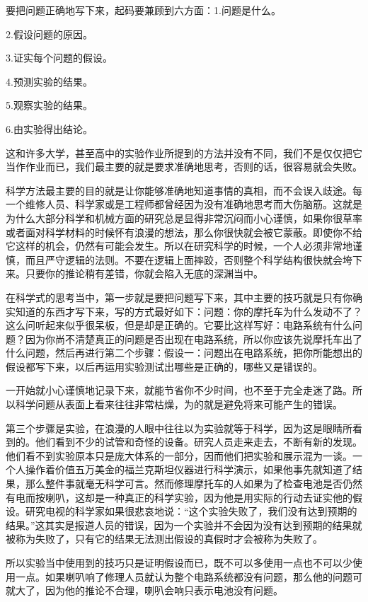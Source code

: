 \documentclass[UTF8]{article}
\begin{document}
\par 要把问题正确地写下来，起码要兼顾到六方面：1.问题是什么。
\par 2.假设问题的原因。
\par 3.证实每个问题的假设。
\par 4.预测实验的结果。
\par 5.观察实验的结果。
\par 6.由实验得出结论。
\par 这和许多大学，甚至高中的实验作业所提到的方法并没有不同，我们不是仅仅把它当作作业而已，我们最主要的就是要求准确地思考，否则的话，很容易就会失败。
\par 科学方法最主要的目的就是让你能够准确地知道事情的真相，而不会误入歧途。每一个维修人员、科学家或是工程师都曾经因为没有准确地思考而大伤脑筋。这就是为什么大部分科学和机械方面的研究总是显得非常沉闷而小心谨慎，如果你很草率或者面对科学材料的时候怀有浪漫的想法，那么你很快就会被它蒙蔽。即使你不给它这样的机会，仍然有可能会发生。所以在研究科学的时候，一个人必须非常地谨慎，而且严守逻辑的法则。不要在逻辑上面摔跤，否则整个科学结构很快就会垮下来。只要你的推论稍有差错，你就会陷入无底的深渊当中。
\par 在科学式的思考当中，第一步就是要把问题写下来，其中主要的技巧就是只有你确实知道的东西才写下来，写的方式最好如下：问题：你的摩托车为什么发动不了？这么问听起来似乎很呆板，但是却是正确的。它要比这样写好：电路系统有什么问题？因为你尚不清楚真正的问题是否出现在电路系统，所以你应该先说摩托车出了什么问题，然后再进行第二个步骤：假设一：问题出在电路系统，把你所能想出的假设都写下来，以后再运用实验测试出哪些是正确的，哪些又是错误的。
\par 一开始就小心谨慎地记录下来，就能节省你不少时间，也不至于完全走迷了路。所以科学问题从表面上看来往往非常枯燥，为的就是避免将来可能产生的错误。
\par 第三个步骤是实验，在浪漫的人眼中往往以为实验就等于科学，因为这是眼睛所看到的。他们看到不少的试管和奇怪的设备。研究人员走来走去，不断有新的发现。他们看不到实验原本只是庞大体系的一部分，因而他们把实验和展示混为一谈。一个人操作着价值五万美金的福兰克斯坦仪器进行科学演示，如果他事先就知道了结果，那么整件事就毫无科学可言。然而修理摩托车的人如果为了检查电池是否仍然有电而按喇叭，这却是一种真正的科学实验，因为他是用实际的行动去证实他的假设。研究电视的科学家如果很悲哀地说：“这个实验失败了，我们没有达到预期的结果。”这其实是报道人员的错误，因为一个实验并不会因为没有达到预期的结果就被称为失败了，只有它的结果无法测出假设的真假时才会被称为失败了。
\par 所以实验当中使用到的技巧只是证明假设而已，既不可以多使用一点也不可以少使用一点。如果喇叭响了修理人员就认为整个电路系统都没有问题，那么他的问题可就大了，因为他的推论不合理，喇叭会响只表示电池没有问题。
\end{document}
